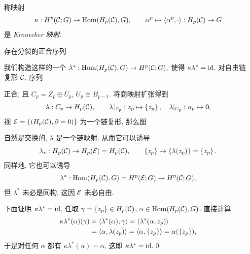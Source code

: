 \begin{Definition}[Kronecker 映射]
	称映射
	\[
		\kappa : H^p(\mathcal{C};G)\to\mathrm{Hom}(H_p(\mathcal{C}),G),\qquad \alpha^p\mapsto\left\langle \alpha^p,\cdot \right\rangle : H_p(\mathcal{C})\to G
	\]
	是 \emph{Kronecker 映射}.
\end{Definition}

\begin{Lemma}
	存在分裂的正合序列
	\begin{center}
	\end{center}
\end{Lemma}
\begin{Proof}
	我们构造这样的一个 $ \lambda^* : \mathrm{Hom}(H_p(\mathcal{C}),G)\to H^p(\mathcal{C};G) $, 使得 $ \kappa\lambda^*=\mathrm{id} $. 对自由链复形 $ \mathcal{C} $, 序列
	\begin{center}
	\end{center}
	正合, 且 $ C_p=Z_p\oplus U_p $, $ U_p\cong B_{p-1} $. 将商映射扩张得到
	\[
		\lambda : C_p\to H_p(\mathcal{C}),\qquad \lambda|_{Z_p} : z_p\mapsto\left\{ z_p \right\},\quad \lambda|_{U_p} : u_p\mapsto 0,
	\]
	视 $ \mathcal{E}=\left\{ (H_p(\mathcal{C}),\partial=0) \right\} $ 为一个链复形, 那么图
	\begin{center}
	\end{center}
	自然是交换的, $ \lambda $ 是一个链映射. 从而它可以诱导
	\[
		\lambda_* : H_p(\mathcal{C})\to H_p(\mathcal{E})=H_p(\mathcal{C}),\qquad \left\{ z_p \right\}\mapsto\left\{ \lambda(z_p) \right\}=\left\{ z_p \right\}.
	\]
	同样地, 它也可以诱导
	\[
		\lambda^* : \mathrm{Hom}(H_p(\mathcal{C}),G)=H^p(\mathcal{E};G)\to H^p(\mathcal{C};G),
	\]
	但 $ \lambda^* $ 未必是同构, 这因 $ \mathcal{E} $ 未必自由.

	下面证明 $ \kappa\lambda^*=\mathrm{id} $, 任取 $ \gamma=\left\{ z_p \right\}\in H_p(\mathcal{C}) $, $ \alpha\in\mathrm{Hom}(H_p(\mathcal{C}),G) $. 直接计算
	\[
		\begin{aligned}
			\kappa\lambda^*(\alpha)(\gamma)&=\left\langle \lambda^*(\alpha),\gamma \right\rangle=\left\langle \lambda^*(\alpha,z_p) \right\rangle\\
			&=\left\langle \alpha,\lambda(z_p) \right\rangle=\left\langle \alpha,\left\{ z_p \right\} \right\rangle=\alpha(\left\{ z_p \right\}),
		\end{aligned}
	\]
	于是对任何 $ \alpha $ 都有 $ \kappa\lambda^*(\alpha)=\alpha $, 这即 $ \kappa\lambda^*=\mathrm{id} $.\qed
\end{Proof}

